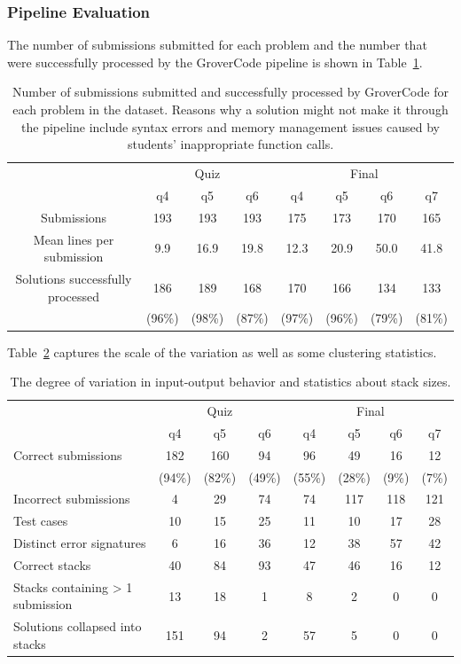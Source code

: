 \subsubsection{Pipeline Evaluation}

The number of submissions submitted for each problem and the number that were successfully processed by the GroverCode pipeline is shown in Table~\ref{table:num_submissions}.

\begin{table}[h!]
\centering
\begin{tabular}{|c|c|c|c|c|c|c|c|}
\hline
& \multicolumn{3}{c|}{Quiz} & \multicolumn{4}{c|}{Final} \\
\cline{2-8}
& q4 & q5 & q6 & q4 & q5 & q6 & q7 \\
\hline
Submissions & 193 & 193 & 193 & 175 & 173 & 170 & 165 \\
\hline
Mean lines per submission & 9.9 & 16.9 & 19.8 & 12.3 & 20.9 & 50.0 & 41.8 \\
\hline
Solutions successfully processed & 186 & 189 & 168  & 170 & 166  & 134 & 133 \\
 & (96\%) & (98\%) & (87\%) & (97\%) & (96\%) & (79\%) & (81\%) \\
\hline
\end{tabular}
\caption{Number of submissions submitted and successfully processed  by GroverCode for each problem in the dataset. Reasons why a solution might not make it through the pipeline include syntax errors and memory management issues caused by students' inappropriate function calls.}
\label{table:num_submissions}
\end{table}



Table~\ref{table:cluster_stats} captures the scale of the variation as well as some clustering statistics.

\begin{table}[!ht]
\centering
\begin{tabular}{|l|c|c|c|c|c|c|c|}
\hline
& \multicolumn{3}{c|}{Quiz} & \multicolumn{4}{c|}{Final} \\
\cline{2-8}
& q4 & q5 & q6 & q4 & q5 & q6 & q7 \\
\hline
Correct submissions & 182 & 160 & 94 & 96 & 49 & 16 & 12 \\
 & (94\%) & (82\%) & (49\%) & (55\%) & (28\%) & (9\%) & (7\%) \\
\hline
Incorrect submissions & 4 & 29 & 74 & 74 & 117 & 118 & 121 \\
\hline
Test cases & 10 & 15 & 25 & 11 & 10 & 17 & 28 \\
\hline
Distinct error signatures & 6 & 16 & 36 & 12 & 38 & 57 & 42 \\
\hline
Correct stacks & 40 & 84 & 93 & 47 & 46 & 16 & 12 \\
\hline
Stacks containing > 1 submission & 13 & 18 & 1 & 8 & 2 & 0 & 0 \\
\hline
Solutions collapsed into stacks & 151 & 94 & 2 & 57 & 5 & 0 & 0 \\
\hline
\end{tabular}
\caption{The degree of variation in input-output behavior and statistics about stack sizes.}
\label{table:cluster_stats}
\end{table}


